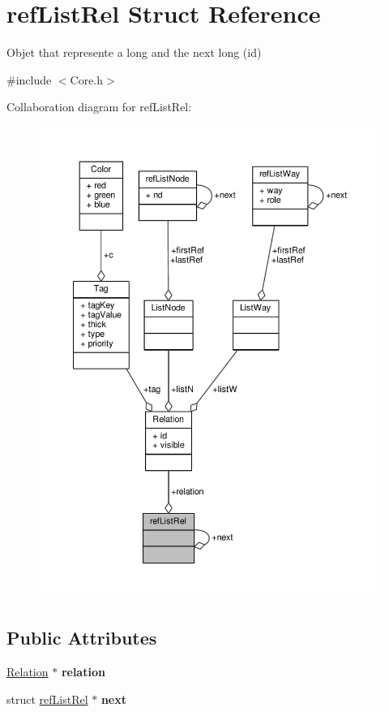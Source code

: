 \hypertarget{structrefListRel}{\section{ref\-List\-Rel Struct Reference}
\label{structrefListRel}
}


Objet that represente a long and the next long (id)  




{\ttfamily \#include $<$Core.\-h$>$}



Collaboration diagram for ref\-List\-Rel\-:
\nopagebreak
\begin{figure}[H]
\begin{center}
\leavevmode
\includegraphics[width=350pt]{structrefListRel__coll__graph}
\end{center}
\end{figure}
\subsection*{Public Attributes}
\begin{DoxyCompactItemize}
\item 
\hypertarget{structrefListRel_a9598a4aceb866d060f6b4425e2d926d3}{\hyperlink{structRelation}{Relation} $\ast$ {\bfseries relation}}\label{structrefListRel_a9598a4aceb866d060f6b4425e2d926d3}

\item 
\hypertarget{structrefListRel_aa108a14d477cc8fc9706a7b535879cf8}{struct \hyperlink{structrefListRel}{ref\-List\-Rel} $\ast$ {\bfseries next}}\label{structrefListRel_aa108a14d477cc8fc9706a7b535879cf8}

\end{DoxyCompactItemize}


